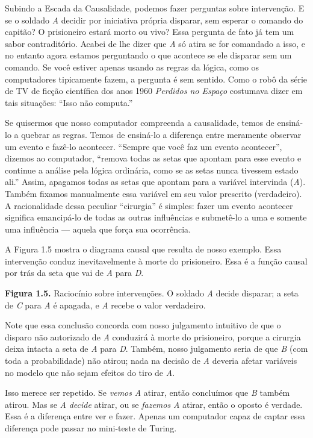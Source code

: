 \documentclass[11pt,a5paper,twoside]{book}
\begin{document}
Subindo a Escada da Causalidade, podemos fazer perguntas sobre intervenção. E se o soldado \textit{A} decidir por iniciativa própria disparar, sem esperar o comando do capitão? O prisioneiro estará morto ou vivo? Essa pergunta de fato já tem um sabor contraditório. Acabei de lhe dizer que \textit{A} só atira se for comandado a isso, e no entanto agora estamos perguntando o que acontece se ele disparar sem um comando. Se você estiver apenas usando as regras da lógica, como os computadores tipicamente fazem, a pergunta é sem sentido. Como o robô da série de TV de ficção científica dos anos 1960 \textit{Perdidos no Espaço} costumava dizer em tais situações: “Isso não computa.”

Se quisermos que nosso computador compreenda a causalidade, temos de ensiná-lo a quebrar as regras. Temos de ensiná-lo a diferença entre meramente observar um evento e fazê-lo acontecer. “Sempre que você faz um evento acontecer”, dizemos ao computador, “remova todas as setas que apontam para esse evento e continue a análise pela lógica ordinária, como se as setas nunca tivessem estado ali.” Assim, apagamos todas as setas que apontam para a variável intervinda (\textit{A}). Também fixamos manualmente essa variável em seu valor prescrito (verdadeiro). A racionalidade dessa peculiar “cirurgia” é simples: fazer um evento acontecer significa emancipá-lo de todas as outras influências e submetê-lo a uma e somente uma influência — aquela que força sua ocorrência.

A Figura 1.5 mostra o diagrama causal que resulta de nosso exemplo. Essa intervenção conduz inevitavelmente à morte do prisioneiro. Essa é a função causal por trás da seta que vai de \textit{A} para \textit{D}.

\textbf{Figura 1.5.} Raciocínio sobre intervenções. O soldado \textit{A} decide disparar; a seta de \textit{C} para \textit{A} é apagada, e \textit{A} recebe o valor verdadeiro.

Note que essa conclusão concorda com nosso julgamento intuitivo de que o disparo não autorizado de \textit{A} conduzirá à morte do prisioneiro, porque a cirurgia deixa intacta a seta de \textit{A} para \textit{D}. Também, nosso julgamento seria de que \textit{B} (com toda a probabilidade) não atirou; nada na decisão de \textit{A} deveria afetar variáveis no modelo que não sejam efeitos do tiro de \textit{A}.

Isso merece ser repetido. Se \textit{vemos} \textit{A} atirar, então concluímos que \textit{B} também atirou. Mas se \textit{A} \textit{decide} atirar, ou se \textit{fazemos} \textit{A} atirar, então o oposto é verdade. Essa é a diferença entre ver e fazer. Apenas um computador capaz de captar essa diferença pode passar no mini-teste de Turing.
\end{document}
